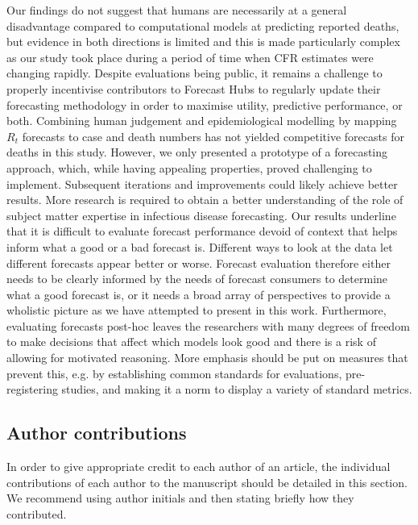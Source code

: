\documentclass[10pt,a4paper,twocolumn]{article}
\begin{document}
Our findings do not suggest that humans are necessarily at a general disadvantage compared to computational models at predicting reported deaths, but evidence in both directions is limited and this is made particularly complex as our study took place during a period of time when CFR estimates were changing rapidly. Despite evaluations being public, it remains a challenge to properly incentivise contributors to Forecast Hubs to regularly update their forecasting methodology in order to maximise utility, predictive performance, or both. Combining human judgement and epidemiological modelling by mapping $R_t$ forecasts to case and death numbers has not yielded competitive forecasts for deaths in this study. However, we only presented a prototype of a forecasting approach, which, while having appealing properties, proved challenging to implement. Subsequent iterations and improvements could likely achieve better results. More research is required to obtain a better understanding of the role of subject matter expertise in infectious disease forecasting. Our results underline that it is difficult to evaluate forecast performance devoid of context that helps inform what a good or a bad forecast is. Different ways to look at the data let different forecasts appear better or worse. Forecast evaluation therefore either needs to be clearly informed by the needs of forecast consumers to determine what a good forecast is, or it needs a broad array of perspectives to provide a wholistic picture as we have attempted to present in this work. Furthermore, evaluating forecasts post-hoc leaves the researchers with many degrees of freedom to make decisions that affect which models look good and there is a risk of allowing for motivated reasoning. More emphasis should be put on measures that prevent this, e.g. by establishing common standards for evaluations, pre-registering studies, and making it a norm to display a variety of standard metrics. 








\subsection*{Author contributions}
In order to give appropriate credit to each author of an article, the individual
contributions of each author to the manuscript should be detailed in this section. We
recommend using author initials and then stating briefly how they contributed.
\end{document}
